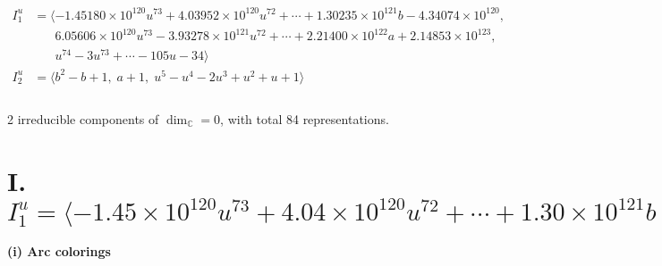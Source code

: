 \documentclass[1p]{elsarticle_modified}
\theoremstyle{definition}
\begin{document}
\begin{align*}
I^u_{1}&=\langle 
-1.45180\times10^{120} u^{73}+4.03952\times10^{120} u^{72}+\cdots+1.30235\times10^{121} b-4.34074\times10^{120},\\
\phantom{I^u_{1}}&\phantom{= \langle  }6.05606\times10^{120} u^{73}-3.93278\times10^{121} u^{72}+\cdots+2.21400\times10^{122} a+2.14853\times10^{123},\\
\phantom{I^u_{1}}&\phantom{= \langle  }u^{74}-3 u^{73}+\cdots-105 u-34\rangle \\
I^u_{2}&=\langle 
b^2- b+1,\;a+1,\;u^5- u^4-2 u^3+u^2+u+1\rangle \\
\\
\end{align*}
\raggedright * 2 irreducible components of $\dim_{\mathbb{C}}=0$, with total 84 representations.\\
\newpage
\renewcommand{\arraystretch}{1}
\centering \section*{I. $I^u_{1}= \langle -1.45\times10^{120} u^{73}+4.04\times10^{120} u^{72}+\cdots+1.30\times10^{121} b-4.34\times10^{120},\;6.06\times10^{120} u^{73}-3.93\times10^{121} u^{72}+\cdots+2.21\times10^{122} a+2.15\times10^{123},\;u^{74}-3 u^{73}+\cdots-105 u-34 \rangle$}
\flushleft \textbf{(i) Arc colorings}\\
\end{document}
